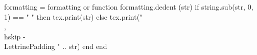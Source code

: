 \startluacode
   formatting = formatting or {}
   function formatting.dedent (str)
    if string.sub(str, 0, 1) ==  " " then
      tex.print(str)
    else
      tex.print("\\,\\hskip -\\LettrinePadding " .. str)
    end
  end
\stopluacode

\def\regularLettrine#1#2{\placefigure[left,none]{}{\vskip -5pt\hbox{\putLettrine{#1}\hskip-4pt}\vskip -10pt}\noindent{\sc\ctxlua{formatting.dedent([==[#2]==])}}}

\def\problem#1#2#3{%
\vskip -\LettrineTotalHeight
\hskip -\LettrineTotalWidth \hskip -\parindent \offset[y=\LettrineTotalHeightMinusLine,x=0pt]{\hbox{\putLettrine{#1}}}{\sc\hskip\LettrinePadding \ctxlua{formatting.dedent([==[#2]==])}\ \it #3} \vskip \baselineskip
}


\newdimen\vPos
\def\problemNP{\dosingleempty\problemnp}
\def\problemnp[#1]#2#3#4{%
\pictureIndent=0cm%
\vPos=\pagetotal%
\iffirstargument%
	\initialIndentation[#1]{7}%
\else%
	\initialIndentation{7}%
\fi%
\vskip -\LettrineTotalHeight
\hskip -\LettrineTotalWidth \hskip -\parindent \offset[y=\LettrineTotalHeightMinusLine,x=0pt]{\hbox{\putLettrine{#2}}}{\sc\hskip \LettrinePadding\ctxlua{formatting.dedent([==[#3]==])}\ \it #4}\par%
\advance\vPos by -\pagetotal
\advance\vPos by 4\baselineskip
\ifnum\vPos>0
\vskip \vPos%
\fi
\vskip 0.5\baselineskip
\resetInitialIndentation}


\def\qedstr{Q. E. D.}
\def\qefstr{Q. E. F.}
\def\qedNB{\hfill\qedstr\vskip 10pt}
\def\qed{\qedNB\vfill\pagebreak}
\def\qefNB{\hfill\qefstr\vskip 10pt}
\def\qef{\qefNB\vfill\pagebreak}

\def\hypstr{hyp.}
\def\conststr{const.}



\setupcolors[state=start]
\setupinterlinespace[line=13pt]

\setupheadertexts[]
\setupheadertexts
	[\hfill\expanded{\uppercase{\fetchmarking[book][][top] \fetchmarking[section][][top]}}\hfill][\pagenumber]
	[\pagenumber][\hfill\expanded{\uppercase{\fetchmarking[book][][top] \fetchmarking[section][][top]}}\hfill]

